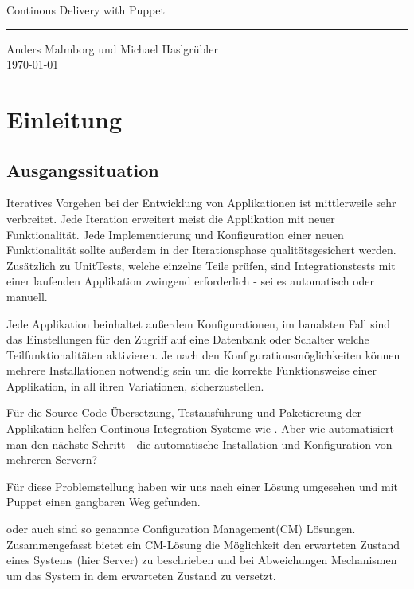 \documentclass[12pt,a4paper,ngerman]{article}
\begin{document}
 \begin{titlepage}
     \begin{flushright}{\huge Continous Delivery with Puppet}
	\end{flushright}
	\hrule
      
      \begin{flushright}
	  {\large Anders Malmborg und Michael Haslgrübler}\\
	  \today
	\end{flushright}
 \end{titlepage}

\pagestyle{plain}

\section{Einleitung}

\subsection{Ausgangssituation}
Iteratives Vorgehen bei der Entwicklung von Applikationen ist mittlerweile sehr verbreitet. Jede Iteration erweitert meist die Applikation mit neuer Funktionalität. Jede Implementierung und Konfiguration einer neuen Funktionalität sollte außerdem in der Iterationsphase qualitätsgesichert werden. Zusätzlich zu UnitTests, welche einzelne Teile prüfen, sind Integrationstests mit einer laufenden Applikation zwingend erforderlich - sei es automatisch oder manuell.

Jede Applikation beinhaltet außerdem Konfigurationen, im banalsten Fall sind das Einstellungen für den Zugriff auf eine Datenbank oder Schalter welche Teilfunktionalitäten aktivieren. Je nach den Konfigurationsmöglichkeiten können mehrere Installationen notwendig sein um die korrekte Funktionsweise einer Applikation, in all ihren Variationen, sicherzustellen.

Für die Source-Code-Übersetzung, Testausführung und Paketiereung der Applikation helfen Continous Integration Systeme wie \cite{jenkins}. Aber wie automatisiert man den nächste Schritt - die automatische Installation und Konfiguration von mehreren Servern? 

Für diese Problemstellung haben wir uns nach einer Lösung umgesehen und mit Puppet einen gangbaren Weg gefunden. 

\cite{puppet} oder auch \cite{chef} sind so genannte Configuration Management(CM) Lösungen. Zusammengefasst bietet ein CM-Lösung die Möglichkeit den erwarteten Zustand eines Systems (hier Server) zu beschrieben und bei Abweichungen Mechanismen um das System in dem erwarteten Zustand zu versetzt.
\end{document}
